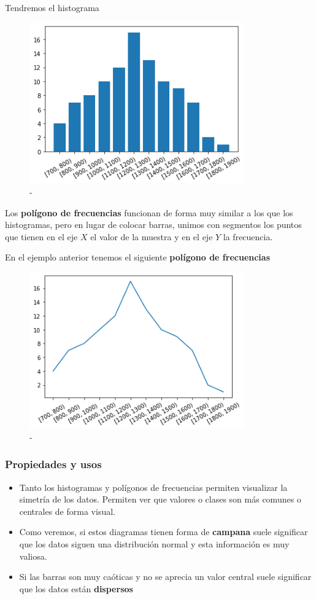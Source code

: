 \documentclass[]{article}
\providecommand{\tightlist}{%
  \setlength{\itemsep}{0pt}\setlength{\parskip}{0pt}}
\theoremstyle{plain}
\theoremstyle{definition}
\theoremstyle{definition} %
\begin{document}
Tendremos el histograma

\begin{figure}
\centering
\includegraphics[width=3.64583in,height=\textheight]{img/histograma2.png}
\caption{-}
\end{figure}

Los \textbf{polígono de frecuencias} funcionan de forma muy similar a
los que los histogramas, pero en lugar de colocar barras, unimos con
segmentos los puntos que tienen en el eje \(X\) el valor de la muestra y
en el eje \(Y\) la frecuencia.

En el ejemplo anterior tenemos el siguiente \textbf{polígono de
frecuencias}

\begin{figure}
\centering
\includegraphics[width=3.64583in,height=\textheight]{img/diag_barras.png}
\caption{-}
\end{figure}

\hypertarget{propiedades-y-usos}{%
\subsubsection{Propiedades y usos}\label{propiedades-y-usos}}

\begin{itemize}
\tightlist
\item
  Tanto los histogramas y polígonos de frecuencias permiten visualizar
  la simetría de los datos. Permiten ver que valores o clases son más
  comunes o centrales de forma visual.
\item
  Como veremos, si estos diagramas tienen forma de \textbf{campana}
  suele significar que los datos siguen una distribución normal y esta
  información es muy valiosa.
\item
  Si las barras son muy caóticas y no se aprecia un valor central suele
  significar que los datos están \textbf{dispersos}
\end{itemize}
\end{document}
